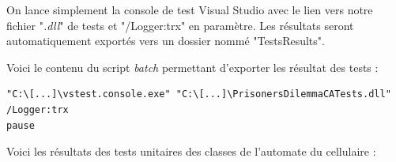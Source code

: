 \documentclass[a4paper, french]{article}
\begin{document}
On lance simplement la console de test Visual Studio avec le lien vers notre fichier "\textit{.dll}" de tests et "/Logger:trx" en paramètre. Les résultats seront automatiquement exportés vers un dossier nommé "TestsResults".

Voici le contenu du script \textit{batch} permettant d'exporter les résultat des tests :

\begin{lstlisting}
"C:\[...]\vstest.console.exe" "C:\[...]\PrisonersDilemmaCATests.dll" /Logger:trx
pause
\end{lstlisting}

\vspace{1cm}
\begin{center}
Voici les résultats des tests unitaires des classes de l'automate du cellulaire :
\end{center}
\end{document}
